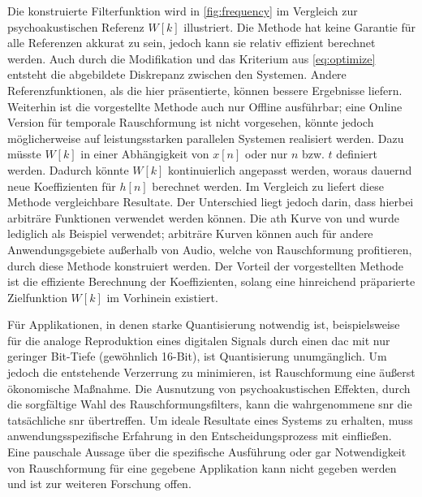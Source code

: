 Die konstruierte Filterfunktion wird in \autoref{fig:frequency} im Vergleich zur psychoakustischen Referenz $W[k]$ illustriert.
Die Methode hat keine Garantie für alle Referenzen akkurat zu sein, jedoch kann sie relativ effizient berechnet werden.
Auch durch die Modifikation und das Kriterium aus \autoref{eq:optimize} entsteht die abgebildete Diskrepanz zwischen den Systemen.
Andere Referenzfunktionen, als die hier präsentierte, können bessere Ergebnisse liefern.
Weiterhin ist die vorgestellte Methode auch nur Offline ausführbar; eine Online Version für temporale Rauschformung ist nicht vorgesehen, könnte jedoch möglicherweise auf leistungsstarken parallelen Systemen realisiert werden.
Dazu müsste $W[k]$ in einer Abhängigkeit von $x[n]$ oder nur $n$ bzw. $t$ definiert werden.
Dadurch könnte $W[k]$ kontinuierlich angepasst werden, woraus dauernd neue Koeffizienten für $h[n]$ berechnet werden.
Im Vergleich zu \citeauthor{noise-shaping} \autocite{noise-shaping} liefert diese Methode vergleichbare Resultate.
Der Unterschied liegt jedoch darin, dass hierbei arbiträre Funktionen verwendet werden können.
Die \gls{ath} Kurve von  \autocite{iso226} und \citeauthor{iso226matlab} \autocite{iso226matlab} wurde lediglich als Beispiel verwendet;
arbiträre Kurven können auch für andere Anwendungsgebiete außerhalb von Audio, welche von Rauschformung profitieren, durch diese Methode konstruiert werden.
Der Vorteil der vorgestellten Methode ist die effiziente Berechnung der Koeffizienten, solang eine hinreichend präparierte Zielfunktion $W[k]$ im Vorhinein existiert.

Für Applikationen, in denen starke Quantisierung notwendig ist, beispielsweise für die analoge Reproduktion eines digitalen Signals durch einen \gls{dac} mit nur geringer Bit-Tiefe (gewöhnlich 16-Bit), ist Quantisierung unumgänglich.
Um jedoch die entstehende Verzerrung zu minimieren, ist Rauschformung eine äußerst ökonomische Maßnahme.
Die Ausnutzung von psychoakustischen Effekten, durch die sorgfältige Wahl des Rauschformungsfilters, kann die wahrgenommene \gls{snr} die tatsächliche \gls{snr} übertreffen.
Um ideale Resultate eines Systems zu erhalten, muss anwendungsspezifische Erfahrung in den Entscheidungsprozess mit einfließen.
Eine pauschale Aussage über die spezifische Ausführung oder gar Notwendigkeit von Rauschformung für eine gegebene Applikation kann nicht gegeben werden und ist zur weiteren Forschung offen.

